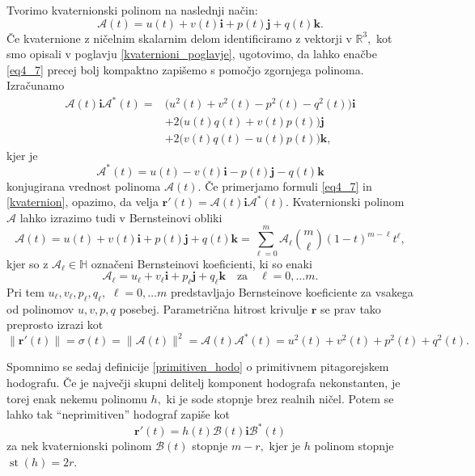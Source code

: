 \documentclass[12pt,a4paper,twoside]{article}
\theoremstyle{definition} %
\theoremstyle{plain} %
\theoremstyle{primerstyle}
\numberwithin{equation}{section}  %
\newcommand{\R}{\mathbb R}
\newcommand{\quat}{\mathbb H}
\newcommand{\rV}{\mathbf{r}}
\newcommand{\iV}{\mathbf{i}}
\newcommand{\jV}{\mathbf{j}}
\newcommand{\kV}{\mathbf{k}}
\newcommand{\AQ}{\mathcal{A}}
\newcommand{\BQ}{\mathcal{B}}
\DeclareMathOperator{\st}{st}
\begin{document}
Tvorimo kvaternionski polinom na naslednji način:
\begin{equation}
	\AQ(t)=u(t)+v(t)\iV+p(t)\jV+q(t)\kV.
\end{equation}
Če kvaternione z ničelnim skalarnim delom identificiramo z vektorji v $\R^3,$ kot smo opisali v poglavju \ref{kvaternioni_poglavje}, ugotovimo, da lahko enačbe \eqref{eq4_7} precej bolj kompaktno zapišemo s pomočjo zgornjega polinoma. Izračunamo
\begin{align}
	\AQ(t)\iV\AQ^*(t)=&\big(u^2(t)+v^2(t)-p^2(t)-q^2(t)\big)\iV \nonumber \\
	&+2\big(u(t)q(t)+v(t)p(t)\big)\jV \label{kvaternion} \\
	&+2\big(v(t)q(t)-u(t)p(t)\big)\kV, \nonumber
\end{align}
kjer je
\begin{equation}
	\AQ^*(t)=u(t)-v(t)\iV-p(t)\jV-q(t)\kV
\end{equation}
konjugirana vrednost polinoma $\AQ(t).$ Če primerjamo formuli \eqref{eq4_7} in \eqref{kvaternion}, opazimo, da velja $\rV'(t)=\AQ(t)\iV\AQ^*(t).$ Kvaternionski polinom $\AQ$ lahko izrazimo tudi v Bernsteinovi obliki
\begin{equation}
	\AQ(t)=u(t)+v(t)\iV+p(t)\jV+q(t)\kV=\sum_{\ell=0}^m\AQ_{\ell} \binom{m}{\ell}(1-t)^{m-\ell}t^{\ell},
\end{equation}
kjer so z $\AQ_{\ell}\in\quat$ označeni Bernsteinovi koeficienti, ki so enaki
\begin{equation}
	\label{bern_koef_quat}
	\AQ_{\ell}=u_{\ell}+v_{\ell}\iV+p_{\ell}\jV+q_{\ell}\kV \quad \text{za} \quad \ell=0,\dots m.
\end{equation}
Pri tem $u_{\ell},v_{\ell},p_{\ell},q_{\ell},$ $\ell=0,\dots m$ predstavljajo Bernsteinove koeficiente za vsakega od polinomov $u,v,p,q$ posebej. Parametrična hitrost krivulje $\rV$ se prav tako preprosto izrazi kot
\begin{equation}
	\label{kvaternionska_hitrost}
	\lVert \rV'(t) \rVert=\sigma(t)=\lVert \AQ(t) \rVert^2=\AQ(t) \AQ^*(t)=u^2(t)+v^2(t)+p^2(t)+q^2(t).
\end{equation}

Spomnimo se sedaj definicije \ref{primitiven_hodo} o primitivnem pitagorejskem hodografu. Če je največji skupni delitelj komponent hodografa nekonstanten, je torej enak nekemu polinomu $h,$ ki je sode stopnje brez realnih ničel. Potem se lahko tak ``neprimitiven'' hodograf zapiše kot
\begin{equation}
	\label{Bkvaternion}
	\rV'(t)=h(t)\BQ(t)\iV\BQ^*(t)
\end{equation}
za nek kvaternionski polinom $\BQ(t)$ stopnje $m-r,$ kjer je $h$ polinom stopnje $\st(h)=2r.$
\end{document}
